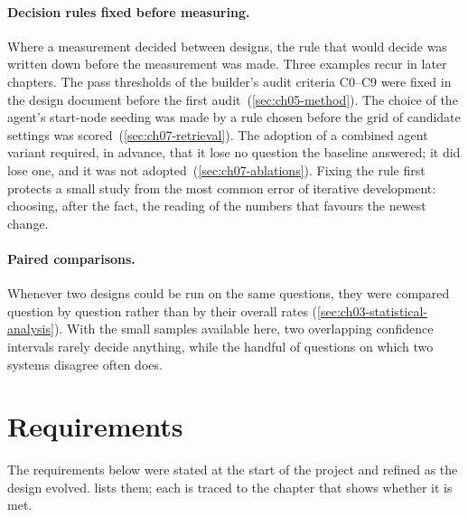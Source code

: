 \paragraph{Decision rules fixed before measuring.} Where a measurement decided between designs, the rule
that would decide was written down before the measurement was made. Three examples recur in later chapters.
The pass thresholds of the builder's audit criteria C0--C9 were fixed in the design document before the
first audit~(\cref{sec:ch05-method}). The choice of the agent's start-node seeding
was made by a rule chosen before the grid of candidate settings was scored~(\cref{sec:ch07-retrieval}).
The adoption of a combined agent variant required, in advance, that it lose no question the baseline
answered; it did lose one, and it was not adopted~(\cref{sec:ch07-ablations}). Fixing the rule
first protects a small study from the most common error of iterative development: choosing, after the
fact, the reading of the numbers that favours the newest change.

\paragraph{Paired comparisons.} Whenever two designs could be run on the same questions, they were compared
question by question rather than by their overall rates (\cref{sec:ch03-statistical-analysis}). With the
small samples available here, two overlapping confidence intervals rarely decide anything, while the
handful of questions on which two systems disagree often does.

\section{Requirements}\label{sec:ch03-requirements}

The requirements below were stated at the start of the project and refined as the design evolved.
 lists them; each is traced to the chapter that shows whether it is met.

